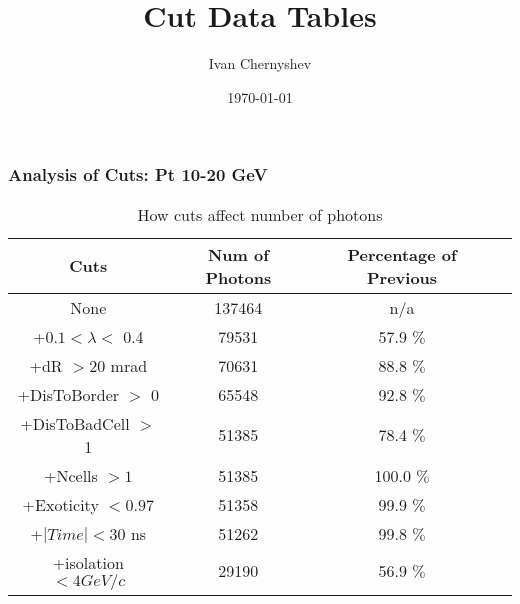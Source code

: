 \documentclass{beamer}
\title{Cut Data Tables}
\author{Ivan Chernyshev}
\date{\today}
\begin{document}
 

\frame 
{ 
\frametitle{Analysis of Cuts: Pt 10-20 GeV} 
\begin{table} 
\caption{How cuts affect number of photons} 
\centering 
\begin{tabular}{c c c c} 
\hline\hline 
Cuts & Num of Photons & Percentage of Previous\\ [0.5ex] 
\hline
None & 137464 & n/a\\
+$0.1 < \lambda <$ 0.4 & 79531 & 57.9 $\%$ \\
+dR $> 20$ mrad & 70631 & 88.8 $\%$ \\
+DisToBorder $>$ 0 & 65548 & 92.8 $\%$ \\
+DisToBadCell $>$ 1 & 51385 & 78.4 $\%$ \\
+Ncells $> 1$ & 51385 & 100.0 $\%$ \\
+Exoticity $< 0.97$ & 51358 & 99.9 $\%$ \\
+$|Time| < 30$ ns & 51262 & 99.8 $\%$ \\
+isolation $< 4 GeV/c$ & 29190 & 56.9 $\%$ \\
[1ex] 
\hline 
\end{tabular} 
\label{table:nonlin} 
\end{table} 
} 
\end{document}
